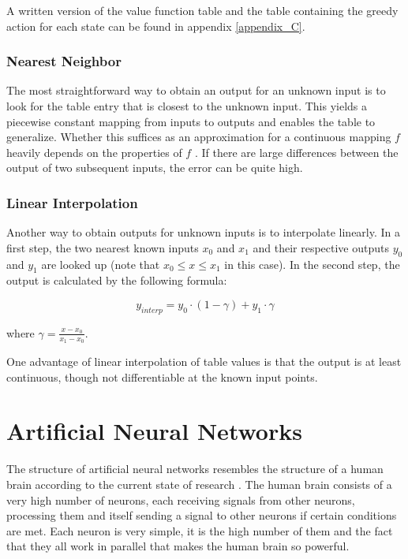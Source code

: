 A written version of the value function table and the table containing the greedy action for each state can be found in appendix \ref{appendix_C}.

\subsubsection{Nearest Neighbor}

The most straightforward way to obtain an output for an unknown input is to look for the table entry that is closest to the unknown input. This yields a piecewise constant mapping from inputs to outputs and enables the table to generalize. Whether this suffices as an approximation for a continuous mapping $f$ heavily depends on the properties of $f$ . If there are large differences between the output of two subsequent inputs, the error can be quite high.

\subsubsection{Linear Interpolation}

Another way to obtain outputs for unknown inputs is to interpolate linearly. In a first step, the two nearest known inputs $x_0$ and $x_1$ and their respective outputs $y_0$ and $y_1$ are looked up (note that $x_0 \leq x \leq x_1$ in this case). In the second step, the output is calculated by the following formula:

\begin{equation}
y_{interp} = y_0 \cdot (1-\gamma) + y_1 \cdot \gamma
\end{equation}

where $\gamma = \frac{x - x_0}{x_1 - x_0}$.

One advantage of linear interpolation of table values is that the output is at least continuous, though not differentiable at the known input points.

\section{Artificial Neural Networks}

The structure of artificial neural networks resembles the structure of a human brain according to the current state of research \cite[Chapter~1.1]{Kriesel2007NeuralNetworks}. The human brain consists of a very high number of neurons, each receiving signals from other neurons, processing them and itself sending a signal to other neurons if certain conditions are met. Each neuron is very simple, it is the high number of them and the fact that they all work in parallel that makes the human brain so powerful. 

